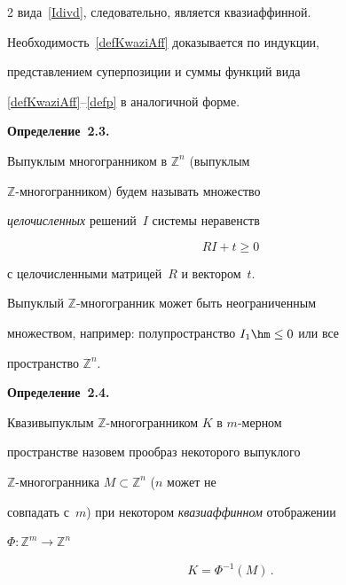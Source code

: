 \begin{multicols}{2}
вида~\eqref{Idivd}, следовательно, является квазиаффинной.

Необходимость~\eqref{defKwaziAff} доказывается по индукции,

представлением суперпозиции и суммы функций вида

\eqref{defKwaziAff}--\eqref{defp} в аналогичной форме.



\smallskip



\noindent

\textbf{Определение~2.3.}

Выпуклым многогранником в $\mathbb{Z}^n$ (выпуклым

$\mathbb{Z}$-много\-гран\-ником) будем называть множество

\textit{целочисленных} решений~$I$ системы неравенств

\begin{equation}

RI+t\geq 0 \label{defVip}

\end{equation}

с целочисленными матрицей~$R$ и вектором~$t$.



\smallskip



Выпуклый $\mathbb{Z}$-многогранник может быть неограниченным

множеством, например: полупространство $I_1\hm\leq0$ или все

пространство $\mathbb{Z}^n$.



\smallskip



\noindent

\textbf{Определение~2.4.}

Квазивыпуклым $\mathbb{Z}$-мно\-го\-гран\-ни\-ком $K$ в $m$-мер\-ном

пространстве назовем прообраз некоторого выпуклого

$\mathbb{Z}$-мно\-го\-гран\-ни\-ка $M\subset\mathbb{Z}^n$ ($n$ может не

совпадать с~$m$) при некотором \textit{квазиаффинном} отображении

$\Phi:\mathbb{Z}^m\to\mathbb{Z}^n$

$$

K = \Phi^{-1}(M)\,.

$$






\end{multicols}
